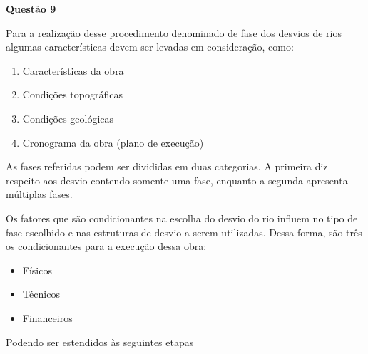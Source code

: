 \item[]\textbf{Questão 9}

\hspace{1cm}Para a realização desse procedimento denominado de fase dos desvios de rios algumas características devem ser levadas em consideração, como:

\begin{enumerate}
	\item Características da obra
	\item Condições topográficas
	\item Condições geológicas
	\item Cronograma da obra (plano de execução)
\end{enumerate}

\hspace{1cm}As fases referidas podem ser divididas em duas categorias. A primeira diz respeito aos desvio contendo somente uma fase, enquanto a segunda apresenta múltiplas fases.

\hspace{1cm}Os fatores que são condicionantes na escolha do desvio do rio influem no tipo de fase escolhido e nas estruturas de desvio a serem utilizadas. Dessa forma, são três os condicionantes para a execução dessa obra: 

\begin{itemize}
	\item Físicos
	\item Técnicos
	\item Financeiros
\end{itemize} 

Podendo ser estendidos às seguintes etapas

